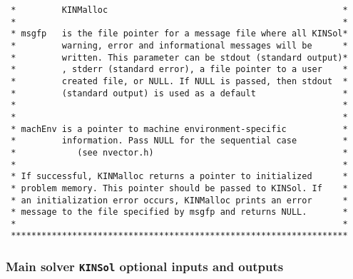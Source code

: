 \begin{verbatim}
 *         KINMalloc                                              *
 *                                                                *
 * msgfp   is the file pointer for a message file where all KINSol*
 *         warning, error and informational messages will be      *
 *         written. This parameter can be stdout (standard output)*
 *         , stderr (standard error), a file pointer to a user    *
 *         created file, or NULL. If NULL is passed, then stdout  *
 *         (standard output) is used as a default                 *
 *                                                                *
 *                                                                *
 * machEnv is a pointer to machine environment-specific           *
 *         information. Pass NULL for the sequential case         *
 *            (see nvector.h)                                     *
 *                                                                *
 * If successful, KINMalloc returns a pointer to initialized      *
 * problem memory. This pointer should be passed to KINSol. If    *
 * an initialization error occurs, KINMalloc prints an error      *
 * message to the file specified by msgfp and returns NULL.       *
 *                                                                *
 ******************************************************************

\end{verbatim}
\normalsize

\subsubsection{Main solver {\tt KINSol} optional inputs and outputs}

